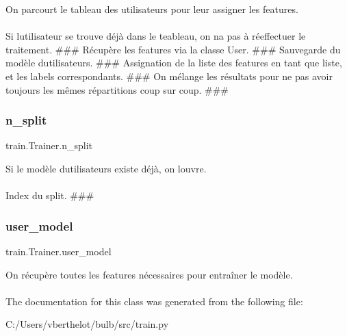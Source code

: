 On parcourt le tableau des utilisateurs pour leur assigner les features. 

\paragraph*{}

Si l\textquotesingle{}utilisateur se trouve déjà dans le teableau, on n\textquotesingle{}a pas à réeffectuer le traitement. \#\#\# Récupère les features via la classe User. \#\#\# Sauvegarde du modèle d\textquotesingle{}utilisateurs. \#\#\# Assignation de la liste des features en tant que liste, et les labels correspondants. \#\#\# On mélange les résultats pour ne pas avoir toujours les mêmes répartitions coup sur coup. \#\#\# \mbox{\label{classtrain_1_1_trainer_ac54aaf4028ad0a283506e27d2b7f8118}} 
\subsubsection{\texorpdfstring{n\+\_\+split}{n\_split}}
{\footnotesize\ttfamily train.\+Trainer.\+n\+\_\+split}



Si le modèle d\textquotesingle{}utilisateurs existe déjà, on l\textquotesingle{}ouvre. 

\paragraph*{}

Index du split. \#\#\# \mbox{\label{classtrain_1_1_trainer_adb7df426e58f065bdcdfd9289b5b779b}} 
\subsubsection{\texorpdfstring{user\+\_\+model}{user\_model}}
{\footnotesize\ttfamily train.\+Trainer.\+user\+\_\+model}



On récupère toutes les features nécessaires pour entraîner le modèle. 

\paragraph*{}

The documentation for this class was generated from the following file\+:\begin{DoxyCompactItemize}
\item 
C\+:/\+Users/vberthelot/bulb/src/train.\+py\end{DoxyCompactItemize}
